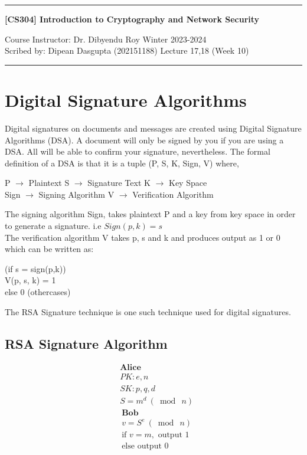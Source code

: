 \documentclass[11pt]{article}
\begin{document}
\setcounter{section}{0}
\noindent
\rule{\textwidth}{1pt}
\begin{center}
{\bf [CS304] Introduction to Cryptography and Network Security}
\end{center}
Course Instructor: Dr. Dibyendu Roy \hfill Winter 2023-2024\\
Scribed by: Dipean Dasgupta (202151188) \hfill Lecture 17,18 (Week 10)
\\
\rule{\textwidth}{1pt}

\section{Digital Signature Algorithms}
Digital signatures on documents and messages are created using Digital Signature Algorithms (DSA). A document will only be signed by you if you are using a DSA. All will be able to confirm your signature, nevertheless. The formal definition of a DSA is that it is a tuple (P, S, K, Sign, V) where, 
\begin{center}
    P $\rightarrow$ Plaintext \hspace{20pt}
    S $\rightarrow$ Signature Text \hspace{20pt}
    K $\rightarrow$ Key Space\\
    Sign $\rightarrow$ Signing Algorithm \hspace{20pt}
    V $\rightarrow$ Verification Algorithm\\
\end{center}
The signing algorithm Sign, takes plaintext P and a key from key space in order to generate a signature. i.e $Sign(p, k) = s$\\ 
The verification algorithm V takes p, s and k and produces output as 1 or 0 which can be written as:
\begin{center}
    (if s = sign(p,k))\\
    V(p, s, k) = 1 \\ 
    else 0 (othercases)
\end{center}
The RSA Signature technique is one such technique used for digital signatures.

\subsection{RSA Signature Algorithm}

\begin{align*}
& \textbf{Alice}\\
& PK: e, n \\
& SK: p, q, d \\
& S = m^d \ (\bmod\ n) 
\end{align*}
\hline
\begin{align*}
& \textbf{Bob}\\
& v = S^e \ (\bmod\ n) \\
& \text{if } v = m, \text{ output } 1 \\
& \text{else output } 0
\end{align*}
\end{document}
